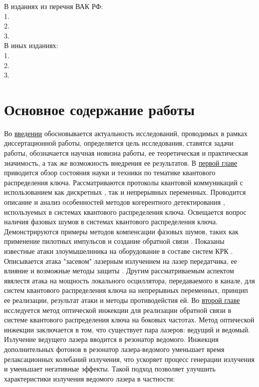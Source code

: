 В изданиях из перечня ВАК РФ:\\
1.\\
2.\\
3.\\

В иных изданиях:\\
1.\\
2.\\
3. 

\section*{Основное содержание работы }
Во \underline{введении} обосновывается актуальность исследований, проводимых в рамках диссертационной работы, определяется цель исследования, ставятся задачи работы, обозначается научная новизна работы, ее теоретическая и практическая значимость, а так же возможность внедрения ее результатов. 
\newline В \underline{первой главе} приводится обзор состояния науки и техники по тематике квантового распределения ключа. Рассматриваются протоколы квантовой коммуникаций с использованием как дискретных \cite{bennett1984,bennett1992,ekert1991,wang2005b}, так и непрерывных переменных\cite{yuan2005,andersen2010,dixon2010,hajomer2024,diamanti2015}. Проводится описание и анализ особенностей методов когерентного детектирования \cite{ip2008a}, используемых в системах квантового распределения ключа. Освещается вопрос наличия фазовых шумов в системах квантового распределения ключа. Демонстрируются примеры методов компенсации фазовых шумов, таких как применение пилотных импульсов \cite{wang2020} и создание обратной связи \cite{khaksar2023a}.  Показаны известные атаки злоумышелнника на оборудование в составе систем КРК \cite{lydersen2010a,gisin2006, huang2013}. Описывается атака "засевом" лазерным излучением на лазер передатчика, ее влияние и возможные методы защиты \cite{huang2019,lovic2023,ma2013}. Другим рассматриваемым аспектом явялестя атака на мощность локального осциллятора, передаваемого в канале, для систем квантового распределения ключа на непрерывных переменных, принцип ее реализации, результат атаки и методы противодейстия ей\cite{jouguet2013, shao2022, fan2023, ren2019}.
\newline Во \underline{второй главе} исследуется метод оптической инжекции \cite{shakhovoy2024,liu2020} для реализации обратной связи в системе квантового распределения ключа на боковых частотах\cite{gleim2016,gleim2017,fadeev2024}. Метод оптической инжекции заключается в том, что существует пара лазеров: ведущий и ведомый. Излучение ведущего лазера вводится в резонатор ведомого. Инжекция дополнительных фотонов в резонатор лазера-ведомого уменьшает время релаксационных колебаний излучения, что ускоряет процесс генерации излучения и уменьшает негативные эффекты. Такой подход позволяет улучшить характеристики излучения ведомого лазера в частности:
